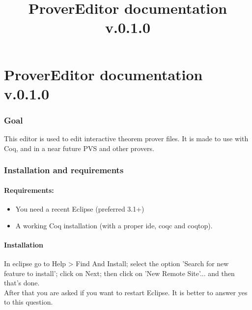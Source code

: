\documentclass[a4paper]{article}
\title{ProverEditor documentation v.0.1.0}
\begin{document}
\part* {ProverEditor documentation v.0.1.0}
\tableofcontents


\section{Goal}
This editor is used to edit interactive theorem prover files.
It is made to use with Coq, and in a near future PVS and other 
provers.

\section{Installation and requirements}
\subsection{Requirements:}
\begin{itemize}
\item You need a recent Eclipse (preferred 3.1+)
\item A working Coq installation (with a proper ide, coqc and coqtop).
\end{itemize}
\subsection{Installation}
In eclipse go to Help > Find And Install; select the option 
'Search for new feature to install'; click on Next; then click on 
'New Remote Site'... and then that's done.\\
After that you are asked if you want to restart Eclipse. It is better
to answer yes to this question. 


\end{document}
